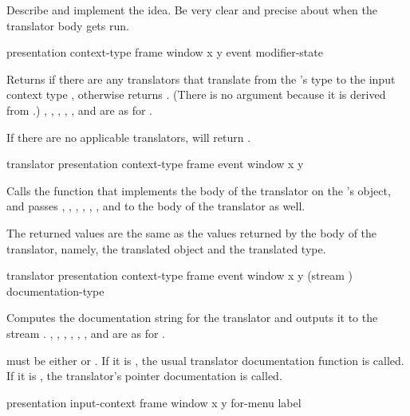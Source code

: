  {Describe and implement the  idea.
Be very clear and precise about when the translator body gets run.}

 {presentation context-type frame window x y
                                            \key event modifier-state}

Returns  if there are any translators that translate from the
 's type to the input context type
, otherwise returns .  (There is no
 argument because it is derived from .)
, , , , , and
 are as for .

If there are no applicable translators, 
will return .


 {translator presentation context-type
                                       frame event window x y}

Calls the function that implements the body of the translator 
on the  's object, and passes
, , , , ,
, and  to the body of the translator as well.

The returned values are the same as the values returned by the body of the
translator, namely, the translated object and the translated type.


 {translator presentation context-type
                                           frame event window x y
                                           \key (stream ) documentation-type}  

Computes the documentation string for the translator  and
outputs it to the stream .  , ,
, , , , and  are as for
.

 must be either  or .  If it is
, the usual translator documentation function is called.  If it is
, the translator's pointer documentation is called.


 {presentation input-context frame window x y
                                 \key for-menu label}


